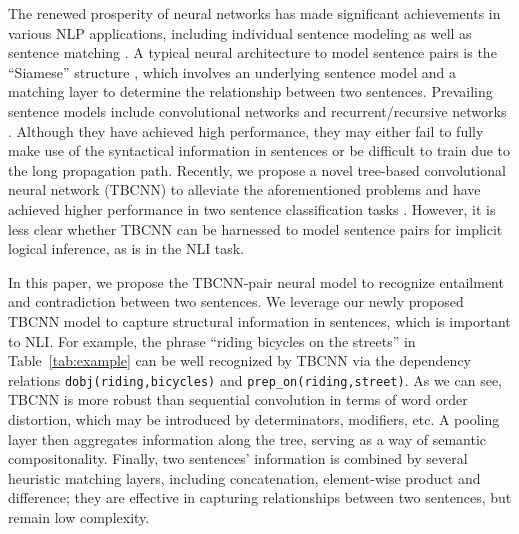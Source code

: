 \documentclass[11pt]{article}
\begin{document}
The renewed prosperity of neural networks has made significant achievements in various NLP applications, including individual sentence modeling \cite{sentenceCNN,sentenceTBCNN} as well as sentence matching \cite{CNN:NIPS,CNN:NAACL}. A typical neural architecture to model sentence pairs is the ``Siamese'' structure \cite{siamese}, which involves an underlying sentence model and a matching layer to determine the relationship between two sentences.  Prevailing sentence models include convolutional networks \cite{sentenceCNN} and recurrent/recursive networks \cite{recursive}. Although they have achieved high performance, they may either fail to fully make use of the syntactical information in sentences or be difficult to train due to the long propagation path. Recently, we propose a novel tree-based convolutional neural network (TBCNN) to alleviate the aforementioned problems and have achieved higher performance in two sentence classification tasks \cite{sentenceTBCNN}. However, it is less clear whether TBCNN can be harnessed to model sentence pairs for implicit logical inference, as is in the NLI task.

\begin{table}[!t]
\vspace{-.2cm}
\centering
{}
\vspace{-.4cm}
\caption{Examples of relations between a premise and a hypothesis: {\tt E}ntailment, {\tt C}ontradiction, and {\tt N}eutral (irrelevant).}
\vspace{-.3cm}
\label{tab:example}
\end{table}

In this paper, we propose the TBCNN-pair neural model to recognize entailment and contradiction between two sentences. We leverage our newly proposed TBCNN model to capture structural information in sentences, which is important to NLI. For example, the phrase ``riding bicycles on the streets'' in Table~\ref{tab:example} can be well recognized by TBCNN via the dependency relations {\tt dobj(riding,bicycles)} and {\tt prep\_on(riding,street)}. As we can see, TBCNN is more robust than sequential convolution in terms of word order distortion, which may be introduced by determinators, modifiers, etc. A pooling layer then aggregates information along the tree, serving as a way of semantic compositonality. Finally, two sentences' information is combined by several heuristic matching layers, including concatenation, element-wise product and difference; they are effective in capturing relationships between two sentences, but remain low complexity.
\end{document}
